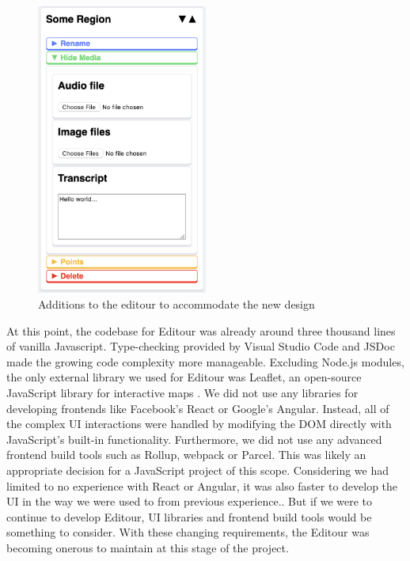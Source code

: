 \documentclass[a4paper, 10pt, american, titlepage]{article}
\begin{document}
\begin{figure}[h]
	\centering
	\includegraphics[width=0.5\textwidth]{editour-additions.png}
	\caption[Additions to the editour to accommodate the new design]
    {Additions to the editour to accommodate the new design}
	\label{fig:editourAdditions}
\end{figure}

At this point, the codebase for Editour was already around three thousand lines
of vanilla Javascript. Type-checking provided by Visual Studio Code and JSDoc
made the growing code complexity more manageable. Excluding Node.js modules,
the only external library we used for Editour was Leaflet, an open-source
JavaScript library for interactive maps \autocite{leafletjs}. We did not use
any libraries for developing frontends like Facebook's React or Google's
Angular. Instead, all of the complex UI interactions were handled by modifying
the DOM directly with JavaScript's built-in functionality. Furthermore, we did
not use any advanced frontend build tools such as Rollup, webpack or Parcel.
This was likely an appropriate decision for a JavaScript project of this scope.
Considering we had limited to no experience with React or Angular, it was also
faster to develop the UI in the way we were used to from previous experience..
But if we were to continue to develop Editour, UI libraries and frontend build
tools would be something to consider. With these changing requirements, the
Editour was becoming onerous to maintain at this stage of the project.
\end{document}
